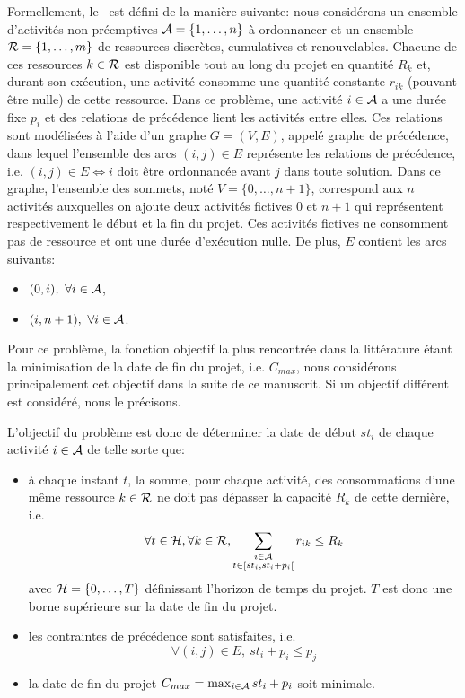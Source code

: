 Formellement, le \RCPSP~est défini de la manière suivante: nous
considérons un ensemble d'activités non préemptives ${\cal A}=\{1,\dots,n\}$
à ordonnancer et un ensemble ${\cal R}=\{1,\dots,m\}$ de ressources
discrètes, cumulatives et renouvelables. Chacune de ces ressources $k
\in {\cal R}$ est disponible tout au long du projet en quantité $R_k$ et,
durant son exécution, une activité consomme une quantité constante
$r_{ik}$ (pouvant être nulle) de cette ressource. Dans ce problème,
une activité $i \in {\cal A}$ a une durée fixe $p_i$ et des relations de
précédence lient les activités entre elles. Ces relations sont
modélisées à l'aide d'un graphe $G=(V,E)$, appelé graphe de
précédence, dans lequel l'ensemble des arcs $(i,j) \in E$ représente
les relations de précédence, i.e. $(i,j) \in E \Leftrightarrow i $
doit être ordonnancée avant $j$ dans toute solution. Dans ce graphe,
l'ensemble des sommets, noté $V=\{0,\dots,n+1\}$, correspond aux $n$
activités auxquelles on ajoute deux activités fictives $0$ et $n+1$
qui représentent respectivement le début et la fin du projet. Ces
activités fictives ne consomment pas de ressource et ont une durée
d'exécution nulle. De plus, $E$ contient les arcs suivants:
\begin{itemize}
\item $(0,i),\ \forall i \in {\cal A}$,
\item $(i,n+1),\ \forall i \in {\cal A}$.
\end{itemize}

Pour ce problème, la fonction objectif la plus rencontrée dans la
littérature étant la minimisation de la date de fin du projet,
i.e. $C_{max}$, nous considérons principalement cet objectif dans la
suite de ce manuscrit. Si un objectif différent est considéré, nous le
précisons.

L'objectif du problème est donc de déterminer la date de début $st_i$
de chaque activité $i\in {\cal A}$ de telle sorte que:
\begin{itemize}
\item à chaque instant $t$, la somme, pour chaque activité, des
  consommations d'une même ressource $k \in {\cal R}$ ne doit pas dépasser la
  capacité $R_{k}$ de cette dernière, i.e.
  \begin{equation}\forall t \in {\cal H}, \forall k \in {\cal R},\sum_{\substack{i\in {\cal A}\\ t \in
        [st_i,st_i+p_i[}} r_{ik} \le R_k\end{equation} 
  avec ${\cal H}=\{0,\dots,T\}$ définissant l'horizon de temps du projet. $T$
  est donc une borne supérieure sur la date de fin du projet.
\item les contraintes de précédence sont satisfaites, i.e. 
  \begin{equation} \forall (i,j) \in E,\ st_i+p_i \le p_j \end{equation}
\item la date de fin du projet $C_{max}= \max_{i \in {\cal A}} st_i+p_i$
  soit minimale. 
\end{itemize}

